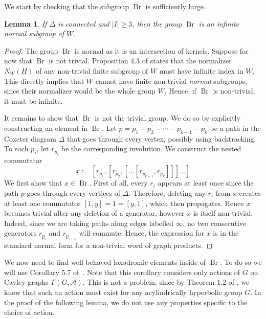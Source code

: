 \documentclass[11pt,letterpaper]{amsart}
\newtheorem{lemma}[prop]{Lemma}
\newcommand{\Br}{\operatorname{Br}}
\newcommand{\claudio}[1]{\todo[color=red!25]{\textbf{Claudio:} #1}}
\begin{document}
We start by checking that the subgroup $\Br$ is sufficiently large.

\begin{lemma}\label{lem:Binfinite}
    If $\Delta$ is connected and $|I| \geq 3$, then the group $\Br$ is an infinite normal subgroup of $W$.
\end{lemma}

\begin{proof}
    The group $\Br$ is normal as it is an intersection of kernels. Suppose for now that $\Br$ is not trivial. Proposition 4.3 of \cite{ParisCoxeter} states that the normalizer $N_W(H)$ of any non-trivial finite subgroup of $W$ must have infinite index in $W$. This directly implies that $W$ cannot have finite non-trivial \emph{normal} subgroups, since their normalizer would be the whole group $W$. Hence, if $\Br$ is non-trivial, it must be infinite.
    
    It remains to show that $\Br$ is not the trivial group. We do so by explicitly constructing an element in $\Br$. Let $ p =p_1-p_2-\cdots-p_{k-1}-p_k$ be a path in the Coxeter diagram $\Delta$ that goes through every vertex, possibly using backtracking. To each $p_i$, let $r_{p_i}$ be the corresponding involution. We construct the nested commutator
    \[
    x := [r_{p_1},[r_{p_2},[\ldots [r_{p_{k-1}},r_{p_k}]]]\ldots]
    \]
    We first show that $x \in \Br$. First of all, every $r_i$ appears at least once since the path $p$ goes through every vertices of $\Delta$. Therefore, deleting any $r_i$ from $x$ creates at least one commutator $[1,y] = 1 = [y,1]$, which then propagates. Hence $x$ becomes trivial after any deletion of a generator, however $x$ is itself non-trivial. Indeed, since we are taking paths along edges labelled $\infty$, no two consecutive generators $r_{p_i}$ and $r_{p_{i+1}}$ will commute. Hence, the expression for $x$ is in the standard normal form for a non-trivial word of graph products.
    
\end{proof}

We now need to find well-behaved loxodromic elements inside of $\Br$. To do so we will use Corollary 5.7 of~\cite{hull2017small}. Note that this corollary considers only actions of $G$ on Cayley graphs $\Gamma(G,\mathcal{A})$. This is not a problem, since by Theorem 1.2 of \cite{OsinAcylindrical}, we know that such an action must exist for any acylindrically hyperbolic group $G$. In the proof of the following lemma, we do not use any properties specific to the choice of action. 
\end{document}
